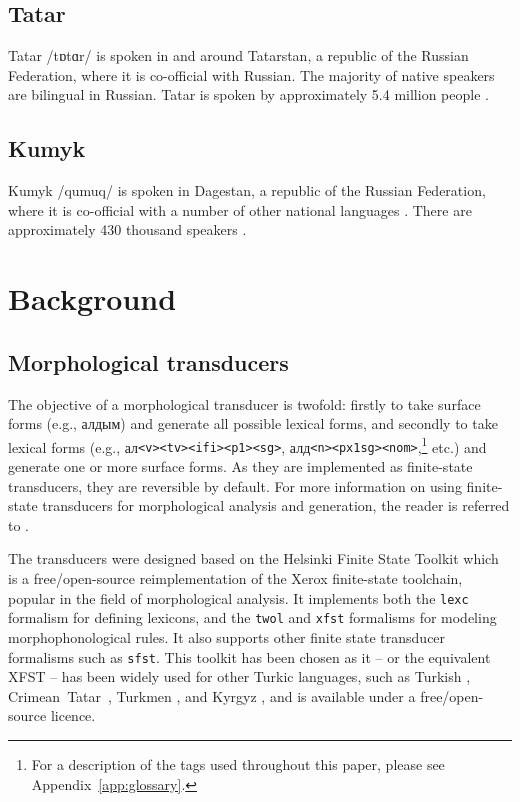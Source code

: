 \documentclass[a4paper,11pt,twocolumn]{article}
\begin{document}

\subsection{Tatar}
Tatar /t{\symbl ɒ}t{\symbl ɑ}r/ is spoken in and around Tatarstan, a republic of the Russian Federation, where it is co-official with Russian. The majority of native speakers are bilingual in Russian. Tatar is spoken by approximately 5.4 million people \citep{ethnologue}.   %

\subsection{Kumyk}
Kumyk /qumuq/ is spoken in Dagestan, a republic of the Russian Federation, where it is co-official with a number of other national languages \citep{ethnologue}.  There are approximately 430 thousand speakers \citep{ethnologue}.

\section{Background}\label{sec:bg}
\subsection{Morphological transducers}
The objective of a morphological transducer is twofold: firstly to take surface forms (e.g., алдым) and generate all possible lexical forms, and secondly to take lexical forms (e.g.,  ал{\tt {\small <v><tv><ifi><p1><sg>}}, алд{\tt {\small <n><px1sg><nom>}},\footnote{For a description of the tags used throughout this paper, please see Appendix~\ref{app:glossary}.} etc.) and generate one or more surface forms.  As they are implemented as finite-state transducers, they are reversible by default. For more information on using finite-state transducers for morphological analysis and generation, the reader is referred to \cite{beesley2003}.

The transducers were designed based on the Helsinki Finite State Toolkit \citep{hfst/2011} which is a free/open-source reimplementation of the Xerox finite-state toolchain, popular in the field of morphological analysis.  It implements both the \texttt{lexc} formalism for defining lexicons, and the \texttt{twol} and \texttt{xfst} formalisms for modeling morphophonological rules.  It also supports other finite state transducer formalisms such as \texttt{sfst}.  This toolkit has been chosen as it -- or the equivalent XFST \citep{beesley2003} -- has been widely used for other Turkic languages, such as Turkish \citep{coltekin2010}, Crimean~Tatar~\citep{altintas2001}, Turkmen \citep{tantug2006}, and Kyrgyz \citep{washington2012}, and is available under a free/open-source licence.
\end{document}
